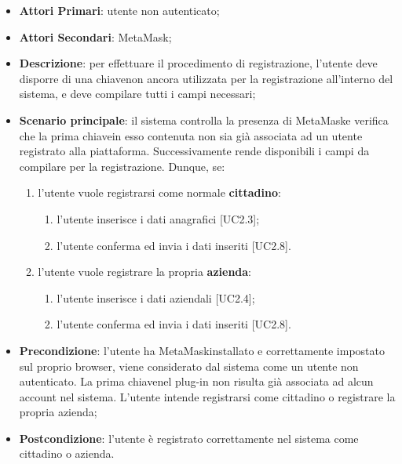 \begin{itemize}
	\item \textbf{Attori Primari}: utente non autenticato;
	\item \textbf{Attori Secondari}: MetaMask\glo;
	\item \textbf{Descrizione}: per effettuare il procedimento di registrazione, l'utente deve disporre di una chiave\glosp non ancora utilizzata per la registrazione all'interno del sistema, e deve compilare tutti i campi necessari;
	\item \textbf{Scenario principale}: 
		il sistema controlla la presenza di MetaMask\glosp e verifica che la prima chiave\glosp in esso contenuta non sia già associata ad un utente registrato alla piattaforma. Successivamente rende disponibili i campi da compilare per la registrazione. Dunque, se:
	\begin{enumerate}[label=\alph*.]
	
		\item l'utente vuole registrarsi come normale \textbf{cittadino}: 
		\begin{enumerate}[label=\roman*.]
			\item l'utente inserisce i dati anagrafici [UC2.3];
			\item l'utente conferma ed invia i dati inseriti [UC2.8].
		\end{enumerate}
		
		
		\item l'utente vuole registrare la propria \textbf{azienda}:
		\begin{enumerate}[label=\roman*.]
			\item l'utente inserisce i dati aziendali [UC2.4];
			\item l'utente conferma ed invia i dati inseriti [UC2.8].
		\end{enumerate}
		
		
		
	\end{enumerate}
	\item \textbf{Precondizione}: l'utente ha MetaMask\glosp installato e correttamente impostato sul proprio browser, viene considerato dal sistema come un utente non autenticato. La prima chiave\glosp nel plug-in non risulta già associata ad alcun account nel sistema. L'utente intende registrarsi come cittadino o registrare la propria azienda; 
	\item \textbf{Postcondizione}: l'utente è registrato correttamente nel sistema come cittadino o azienda.
	
\end{itemize}
